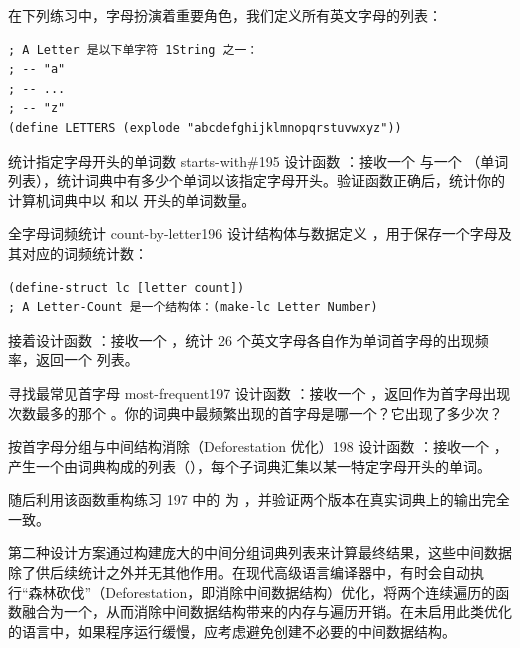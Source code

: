 在下列练习中，字母扮演着重要角色，我们定义所有英文字母的列表：
\begin{lstlisting}[language=BSL]
; A Letter 是以下单字符 1String 之一：
; -- "a"
; -- ...
; -- "z"
(define LETTERS (explode "abcdefghijklmnopqrstuvwxyz"))
\end{lstlisting}

\begin{exercise}{统计指定字母开头的单词数 starts-with\#}{195}
设计函数 ：接收一个  与一个 （单词列表），统计词典中有多少个单词以该指定字母开头。验证函数正确后，统计你的计算机词典中以  和以  开头的单词数量。
\end{exercise}

\begin{exercise}{全字母词频统计 count-by-letter}{196}
设计结构体与数据定义 ，用于保存一个字母及其对应的词频统计数：
\begin{lstlisting}[language=BSL]
(define-struct lc [letter count])
; A Letter-Count 是一个结构体：(make-lc Letter Number)
\end{lstlisting}
接着设计函数 ：接收一个 ，统计 26 个英文字母各自作为单词首字母的出现频率，返回一个  列表。
\end{exercise}

\begin{exercise}{寻找最常见首字母 most-frequent}{197}
设计函数 ：接收一个 ，返回作为首字母出现次数最多的那个 。你的词典中最频繁出现的首字母是哪一个？它出现了多少次？
\end{exercise}

\begin{exercise}{按首字母分组与中间结构消除（Deforestation 优化）}{198}
设计函数 ：接收一个 ，产生一个由词典构成的列表（），每个子词典汇集以某一特定字母开头的单词。

随后利用该函数重构练习 197 中的  为 ，并验证两个版本在真实词典上的输出完全一致。

\begin{notebox}
第二种设计方案通过构建庞大的中间分组词典列表来计算最终结果，这些中间数据除了供后续统计之外并无其他作用。在现代高级语言编译器中，有时会自动执行“森林砍伐”（Deforestation，即消除中间数据结构）优化，将两个连续遍历的函数融合为一个，从而消除中间数据结构带来的内存与遍历开销。在未启用此类优化的语言中，如果程序运行缓慢，应考虑避免创建不必要的中间数据结构。
\end{notebox}
\end{exercise}

